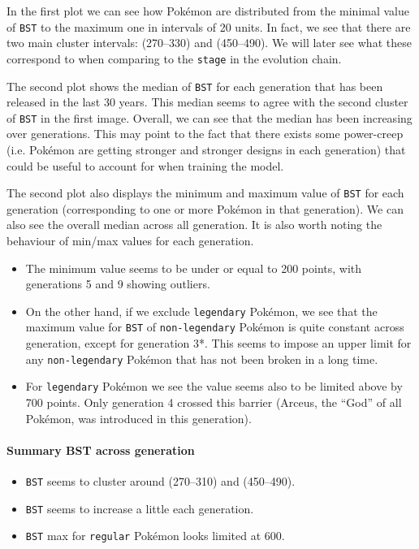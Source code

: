 \documentclass[11pt]{article}
\begin{document}
In the first plot we can see how Pokémon are distributed from the minimal value of \texttt{BST} to the maximum one in intervals of 20 units. In fact, we see that there are two main cluster intervals: (270--330) and (450--490). We will later see what these correspond to when comparing to the \texttt{stage} in the evolution chain.

The second plot shows the median of \texttt{BST} for each generation that has been released in the last 30 years. This median seems to agree with the second cluster of \texttt{BST} in the first image. Overall, we can see that the median has been increasing over generations. This may point to the fact that there exists some power-creep (i.e. Pokémon are getting stronger and stronger designs in each generation) that could be useful to account for when training the model.

The second plot also displays the minimum and maximum value of \texttt{BST} for each generation (corresponding to one or more Pokémon in that generation). We can also see the overall median across all generation. It is also worth noting the behaviour of min/max values for each generation.

\begin{itemize}
    \item The minimum value seems to be under or equal to 200 points, with generations 5 and 9 showing outliers.
    \item On the other hand, if we exclude \texttt{legendary} Pokémon, we see that the maximum value for \texttt{BST} of \texttt{non-legendary} Pokémon is quite constant across generation, except for generation 3*. This seems to impose an upper limit for any \texttt{non-legendary} Pokémon that has not been broken in a long time.
    \item For \texttt{legendary} Pokémon we see the value seems also to be limited above by 700 points. Only generation 4 crossed this barrier (Arceus, the ``God'' of all Pokémon, was introduced in this generation).
\end{itemize}

\paragraph{Summary BST across generation}
\begin{itemize}
    \item \texttt{BST} seems to cluster around (270--310) and (450--490).
    \item \texttt{BST} seems to increase a little each generation.
    \item \texttt{BST} max for \texttt{regular} Pokémon looks limited at 600.
\end{itemize}
\end{document}
